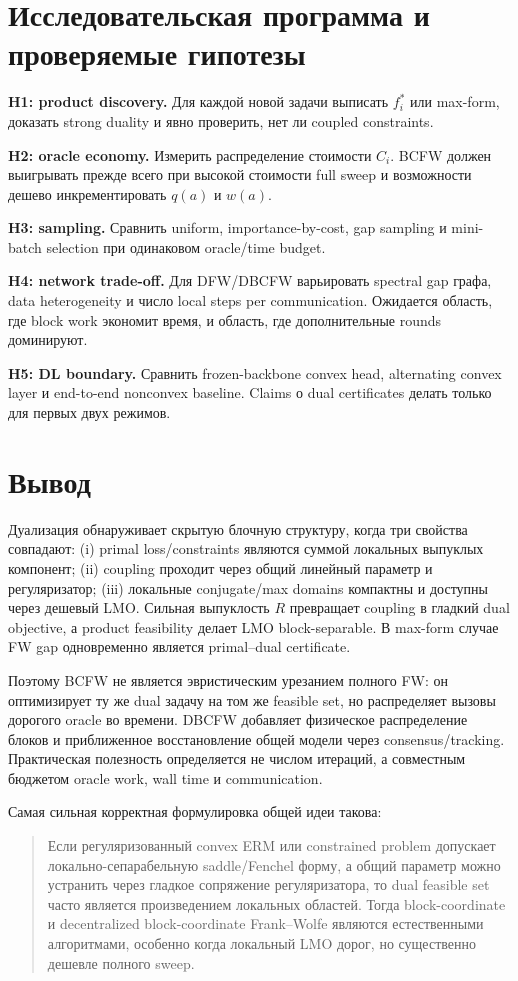 \documentclass[11pt,a4paper]{article}
\begin{document}
\section{Исследовательская программа и проверяемые гипотезы}

\textbf{H1: product discovery.} Для каждой новой задачи выписать \(f_i^*\) или max-form, доказать strong duality и явно проверить, нет ли coupled constraints.

\textbf{H2: oracle economy.} Измерить распределение стоимости \(C_i\). BCFW должен выигрывать прежде всего при высокой стоимости full sweep и возможности дешево инкрементировать \(q(a)\) и \(w(a)\).

\textbf{H3: sampling.} Сравнить uniform, importance-by-cost, gap sampling и mini-batch selection при одинаковом oracle/time budget.

\textbf{H4: network trade-off.} Для DFW/DBCFW варьировать spectral gap графа, data heterogeneity и число local steps per communication. Ожидается область, где block work экономит время, и область, где дополнительные rounds доминируют.

\textbf{H5: DL boundary.} Сравнить frozen-backbone convex head, alternating convex layer и end-to-end nonconvex baseline. Claims о dual certificates делать только для первых двух режимов.

\section{Вывод}

Дуализация обнаруживает скрытую блочную структуру, когда три свойства совпадают: (i) primal loss/constraints являются суммой локальных выпуклых компонент; (ii) coupling проходит через общий линейный параметр и регуляризатор; (iii) локальные conjugate/max domains компактны и доступны через дешевый LMO. Сильная выпуклость \(R\) превращает coupling в гладкий dual objective, а product feasibility делает LMO block-separable. В max-form случае FW gap одновременно является primal--dual certificate.

Поэтому BCFW не является эвристическим урезанием полного FW: он оптимизирует ту же dual задачу на том же feasible set, но распределяет вызовы дорогого oracle во времени. DBCFW добавляет физическое распределение блоков и приближенное восстановление общей модели через consensus/tracking. Практическая полезность определяется не числом итераций, а совместным бюджетом oracle work, wall time и communication.

Самая сильная корректная формулировка общей идеи такова:
\begin{quote}
Если регуляризованный convex ERM или constrained problem допускает локально-сепарабельную saddle/Fenchel форму, а общий параметр можно устранить через гладкое сопряжение регуляризатора, то dual feasible set часто является произведением локальных областей. Тогда block-coordinate и decentralized block-coordinate Frank--Wolfe являются естественными алгоритмами, особенно когда локальный LMO дорог, но существенно дешевле полного sweep.
\end{quote}



\end{document}
